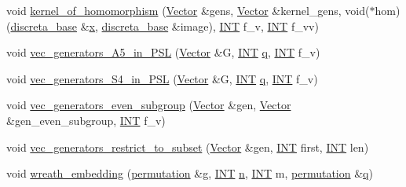 \begin{DoxyCompactItemize}
\item 
void \mbox{\hyperlink{perm__group__gens_8_c_a13788b99964245e11ec79a47adaa667b}{kernel\+\_\+of\+\_\+homomorphism}} (\mbox{\hyperlink{class_vector}{Vector}} \&gens, \mbox{\hyperlink{class_vector}{Vector}} \&kernel\+\_\+gens, void($\ast$hom)(\mbox{\hyperlink{classdiscreta__base}{discreta\+\_\+base}} \&\mbox{\hyperlink{alphabet2_8_c_a6150e0515f7202e2fb518f7206ed97dc}{x}}, \mbox{\hyperlink{classdiscreta__base}{discreta\+\_\+base}} \&image), \mbox{\hyperlink{galois_8h_a09fddde158a3a20bd2dcadb609de11dc}{I\+NT}} f\+\_\+v, \mbox{\hyperlink{galois_8h_a09fddde158a3a20bd2dcadb609de11dc}{I\+NT}} f\+\_\+vv)
\item 
void \mbox{\hyperlink{perm__group__gens_8_c_af41c889a65ee026d1939647e26904adb}{vec\+\_\+generators\+\_\+\+A5\+\_\+in\+\_\+\+P\+SL}} (\mbox{\hyperlink{class_vector}{Vector}} \&G, \mbox{\hyperlink{galois_8h_a09fddde158a3a20bd2dcadb609de11dc}{I\+NT}} \mbox{\hyperlink{simeon_8_c_a92cbb483a3b27ae1a0dbfcb125ce216f}{q}}, \mbox{\hyperlink{galois_8h_a09fddde158a3a20bd2dcadb609de11dc}{I\+NT}} f\+\_\+v)
\item 
void \mbox{\hyperlink{perm__group__gens_8_c_ad85c37ec8824d1e7eabc836ff3dbad23}{vec\+\_\+generators\+\_\+\+S4\+\_\+in\+\_\+\+P\+SL}} (\mbox{\hyperlink{class_vector}{Vector}} \&G, \mbox{\hyperlink{galois_8h_a09fddde158a3a20bd2dcadb609de11dc}{I\+NT}} \mbox{\hyperlink{simeon_8_c_a92cbb483a3b27ae1a0dbfcb125ce216f}{q}}, \mbox{\hyperlink{galois_8h_a09fddde158a3a20bd2dcadb609de11dc}{I\+NT}} f\+\_\+v)
\item 
void \mbox{\hyperlink{perm__group__gens_8_c_a97f04daa9d190c578504d38e10c3e0d8}{vec\+\_\+generators\+\_\+even\+\_\+subgroup}} (\mbox{\hyperlink{class_vector}{Vector}} \&gen, \mbox{\hyperlink{class_vector}{Vector}} \&gen\+\_\+even\+\_\+subgroup, \mbox{\hyperlink{galois_8h_a09fddde158a3a20bd2dcadb609de11dc}{I\+NT}} f\+\_\+v)
\item 
void \mbox{\hyperlink{perm__group__gens_8_c_afd20ce17f98bf2947c213845b48f6bf3}{vec\+\_\+generators\+\_\+restrict\+\_\+to\+\_\+subset}} (\mbox{\hyperlink{class_vector}{Vector}} \&gen, \mbox{\hyperlink{galois_8h_a09fddde158a3a20bd2dcadb609de11dc}{I\+NT}} first, \mbox{\hyperlink{galois_8h_a09fddde158a3a20bd2dcadb609de11dc}{I\+NT}} len)
\item 
void \mbox{\hyperlink{perm__group__gens_8_c_aa29d82e7082af21ca98bbd658b809bce}{wreath\+\_\+embedding}} (\mbox{\hyperlink{classpermutation}{permutation}} \&g, \mbox{\hyperlink{galois_8h_a09fddde158a3a20bd2dcadb609de11dc}{I\+NT}} \mbox{\hyperlink{simeon_8_c_a7f2cd26777ce0ff3fdaf8d02aacbddfb}{n}}, \mbox{\hyperlink{galois_8h_a09fddde158a3a20bd2dcadb609de11dc}{I\+NT}} m, \mbox{\hyperlink{classpermutation}{permutation}} \&\mbox{\hyperlink{simeon_8_c_a92cbb483a3b27ae1a0dbfcb125ce216f}{q}})

\end{DoxyCompactItemize}
